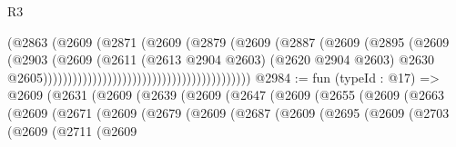 \begin{lexlean}{R3}
\begin{coremodule}
                                                              (@2863
                                                                (@2609
                                                                  (@2871
                                                                    (@2609
                                                                      (@2879
                                                                        (@2609
                                                                          (@2887
                                                                            (@2609
                                                                              (@2895
                                                                                (@2609
                                                                                  (@2903
                                                                                    (@2609
                                                                                      (@2611
                                                                                        (@2613
                                                                                          @2904
                                                                                          @2603)
                                                                                        (@2620
                                                                                          @2904
                                                                                          @2603)
                                                                                        @2630
                                                                                        @2605))))))))))))))))))))))))))))))))))))))))))
@2984 := fun (typeId : @17) =>
  @2609
    (@2631
      (@2609
        (@2639
          (@2609
            (@2647
              (@2609
                (@2655
                  (@2609
                    (@2663
                      (@2609
                        (@2671
                          (@2609
                            (@2679
                              (@2609
                                (@2687
                                  (@2609
                                    (@2695
                                      (@2609
                                        (@2703
                                          (@2609
                                            (@2711
                                              (@2609

\end{coremodule}
\end{lexlean}
